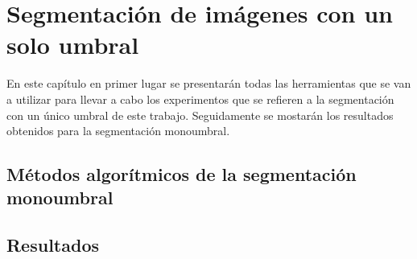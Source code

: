 \chapter{Segmentación de imágenes con un solo umbral}\label{monoumbral}

En este capítulo en primer lugar se presentarán todas las herramientas que se van a utilizar para llevar a cabo los experimentos que se refieren a la segmentación con un único umbral de este trabajo. Seguidamente se mostarán los resultados obtenidos para la segmentación monoumbral.


\section{Métodos algorítmicos de la segmentación monoumbral}\label{sec:algoritmosmono}

\section{Resultados}\label{sec:resultadosmono}